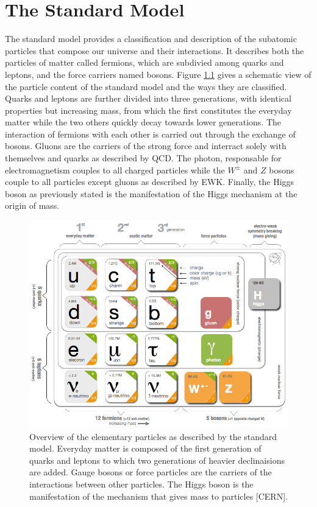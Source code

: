 \chapter{The Standard Model}
\label{chap:I-1-standard-model}

  The standard model provides a classification and description of the subatomic particles that compose our universe and their interactions. It describes both the particles of matter called fermions, which are subdivied among quarks and leptons, and the force carriers named bosons. Figure \ref{fig:I-1-sm-particles} gives a schematic view of the particle content of the standard model and the ways they are classified. Quarks and leptons are further divided into three generations, with identical properties but increasing mass, from which the first constitutes the everyday matter while the two others quickly decay towards lower generations. The interaction of fermions with each other is carried out through the exchange of bosons. Gluons are the carriers of the strong force and interract solely with themselves and quarks as described by QCD. The photon, responsable for electromagnetism couples to all charged particles while the $ W^\pm $ and $ Z $ bosons couple to all particles except gluons as described by EWK. Finally, the Higgs boson as previously stated is the manifestation of the Higgs mechanism at the origin of mass. \\

	\begin{figure}[h!]
		\centering
		\includegraphics[width = 0.8 \textwidth]{img/I-1/sm-particles.png}
		\caption{Overview of the elementary particles as described by the standard model. Everyday matter is composed of the first generation of quarks and leptons to which two generations of heavier declinaisions are added. Gauge bosons or force particles are the carriers of the interactions between other particles. The Higgs boson is the manifestation of the mechanism that gives mass to particles [CERN].}
		\label{fig:I-1-sm-particles}
	\end{figure}

